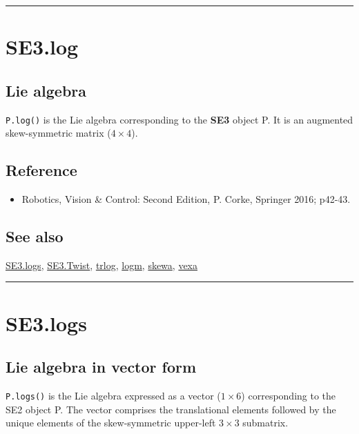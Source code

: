 \vspace{1.5ex}\hrule

\hypertarget{SE3.log}{\section*{SE3.log}}
\subsection*{Lie algebra}


\texttt{P.log()} is the Lie algebra corresponding to the \textbf{\color{red} SE3} object P. It is
an augmented skew-symmetric matrix ($4 \times 4$).


\subsection*{Reference}
\begin{itemize}
  \item Robotics, Vision \& Control: Second Edition, P. Corke, Springer 2016; p42-43.
\end{itemize}

\subsection*{See also}


\hyperlink{SE3.logs}{\color{blue} SE3.logs}, \hyperlink{SE3.Twist}{\color{blue} SE3.Twist}, \hyperlink{trlog}{\color{blue} trlog}, \hyperlink{logm}{\color{blue} logm}, \hyperlink{skewa}{\color{blue} skewa}, \hyperlink{vexa}{\color{blue} vexa}

\vspace{1.5ex}\hrule

\hypertarget{SE3.logs}{\section*{SE3.logs}}
\subsection*{Lie algebra in vector form}


\texttt{P.logs()} is the Lie algebra expressed as a vector ($1 \times 6$)
corresponding to the SE2 object P.  The vector comprises the
translational elements followed by the unique elements of the
skew-symmetric upper-left $3 \times 3$ submatrix.


